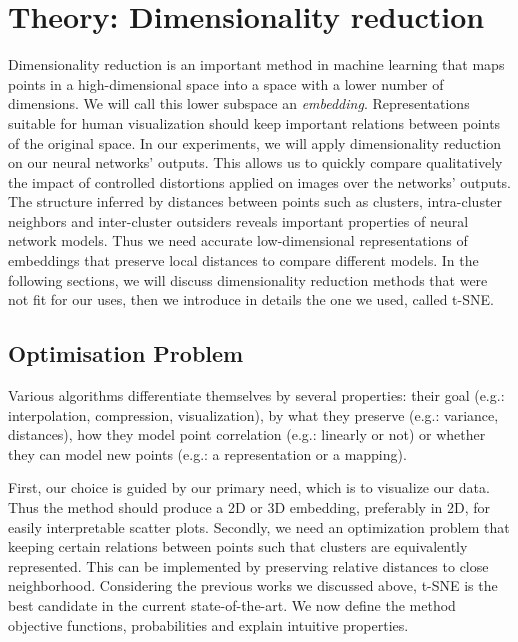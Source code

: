 \documentclass[a4paper,12pt]{report}
\newcommand{\eg}{e.g.}
\begin{document}
\chapter{Theory: Dimensionality reduction}
\label{chap:dim_red}
Dimensionality reduction is an important method in machine learning that maps points in a high-dimensional space into a space with a lower number of dimensions.
We will call this lower subspace an {\em embedding}.
Representations suitable for human visualization should keep important relations between points of the original space.
In our experiments, we will apply dimensionality reduction on our neural networks' outputs.
This allows us to quickly compare qualitatively the impact of controlled distortions applied on images over the networks' outputs.
The structure inferred by distances between points such as clusters, intra-cluster neighbors and inter-cluster outsiders reveals important properties of neural network models.
Thus we need accurate low-dimensional representations of embeddings that preserve local distances to compare different models.
In the following sections, we will discuss dimensionality reduction methods that were not fit for our uses, then we introduce in details the one we used, called t-SNE.

\section{Optimisation Problem}
Various algorithms differentiate themselves by several properties: their goal (\eg: interpolation, compression, visualization), by what they preserve (\eg: variance, distances), how they model point correlation (\eg: linearly or not) or whether they can model new points (\eg: a representation or a mapping).

First, our choice is guided by our primary need, which is to visualize our data.
Thus the method should produce a 2D or 3D embedding, preferably in 2D, for easily interpretable scatter plots.
Secondly, we need an optimization problem that keeping certain relations between points such that clusters are equivalently represented.
This can be implemented by preserving relative distances to close neighborhood.
Considering the previous works we discussed above, t-SNE is the best candidate in the current state-of-the-art.
We now define the method objective functions, probabilities and explain intuitive properties.
\end{document}

